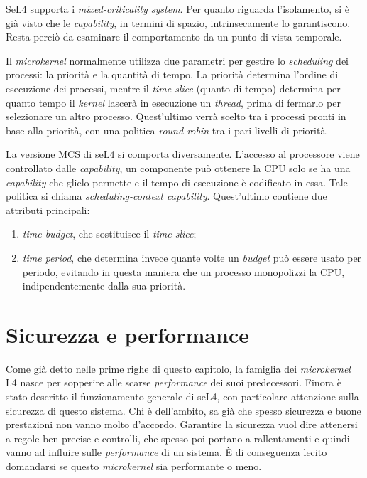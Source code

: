 SeL4 supporta i \textit{mixed-criticality system}. Per quanto riguarda l'isolamento, si è già visto che le \textit{capability}, in termini di spazio, intrinsecamente lo garantiscono. Resta perciò da esaminare il comportamento da un punto di vista temporale.

Il \textit{microkernel} normalmente utilizza due parametri per gestire lo \textit{scheduling} dei processi: la priorità e la quantità di tempo. La priorità determina l'ordine di esecuzione dei processi, mentre il \textit{time slice} (quanto di tempo) determina per quanto tempo il \textit{kernel} lascerà in esecuzione un \textit{thread}, prima di fermarlo per selezionare un altro processo. Quest'ultimo verrà scelto tra i processi pronti in base alla priorità, con una politica \textit{round-robin} tra i pari livelli di priorità.

La versione MCS di seL4 si comporta diversamente. L'accesso al processore viene controllato dalle \textit{capability}, un componente può ottenere la CPU solo se ha una \textit{capability} che glielo permette e il tempo di esecuzione è codificato in essa. Tale politica si chiama \textit{scheduling-context \textit{capability}}. Quest'ultimo contiene due attributi principali: 
\begin{enumerate}
	\item \textit{time budget}, che sostituisce il \textit{time slice};
	\item \textit{time period}, che determina invece quante volte un \textit{budget} può essere usato per periodo, evitando in questa maniera che un processo monopolizzi la CPU, indipendentemente dalla sua priorità.
\end{enumerate}

\section{Sicurezza e performance}
Come già detto nelle prime righe di questo capitolo, la famiglia dei \textit{microkernel} L4 nasce per sopperire alle scarse \textit{performance} dei suoi predecessori. Finora è stato descritto il funzionamento generale di seL4, con particolare attenzione sulla sicurezza di questo sistema. Chi è dell'ambito, sa già che spesso sicurezza e buone prestazioni non vanno molto d'accordo. Garantire la sicurezza vuol dire attenersi a regole ben precise e controlli, che spesso poi portano a rallentamenti e quindi vanno ad influire sulle \textit{performance} di un sistema. È di conseguenza lecito domandarsi se questo \textit{microkernel} sia performante o meno.

